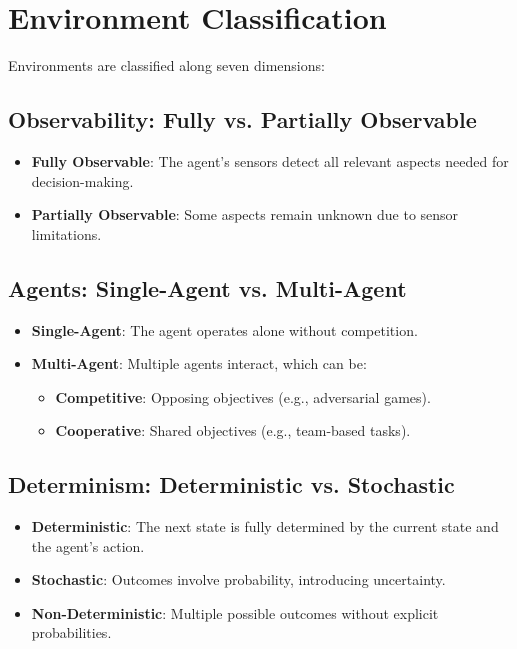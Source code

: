 \documentclass[conference]{IEEEtran}
\begin{document}
\section{Environment Classification}
Environments are classified along seven dimensions:

\subsection{Observability: Fully vs. Partially Observable}
\begin{itemize}
    \item \textbf{Fully Observable}: The agent’s sensors detect all relevant aspects needed for decision-making.
    \item \textbf{Partially Observable}: Some aspects remain unknown due to sensor limitations.
\end{itemize}

\subsection{Agents: Single-Agent vs. Multi-Agent}
\begin{itemize}
    \item \textbf{Single-Agent}: The agent operates alone without competition.
    \item \textbf{Multi-Agent}: Multiple agents interact, which can be:
    \begin{itemize}
        \item \textbf{Competitive}: Opposing objectives (e.g., adversarial games).
        \item \textbf{Cooperative}: Shared objectives (e.g., team-based tasks).
    \end{itemize}
\end{itemize}

\subsection{Determinism: Deterministic vs. Stochastic}
\begin{itemize}
    \item \textbf{Deterministic}: The next state is fully determined by the current state and the agent’s action.
    \item \textbf{Stochastic}: Outcomes involve probability, introducing uncertainty.
    \item \textbf{Non-Deterministic}: Multiple possible outcomes without explicit probabilities.
\end{itemize}
\end{document}
